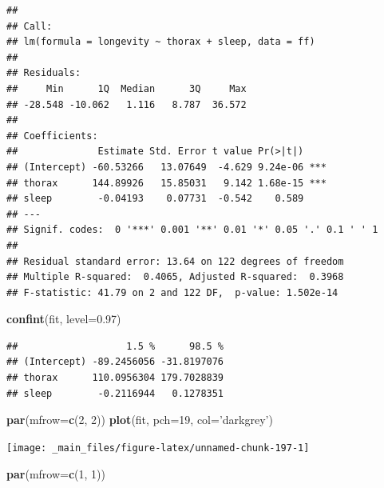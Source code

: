 \documentclass[]{book}
\newenvironment{Shaded}{\begin{snugshade}}{\end{snugshade}}
\newcommand{\KeywordTok}[1]{\textcolor[rgb]{0.13,0.29,0.53}{\textbf{#1}}}
\newcommand{\DataTypeTok}[1]{\textcolor[rgb]{0.13,0.29,0.53}{#1}}
\newcommand{\DecValTok}[1]{\textcolor[rgb]{0.00,0.00,0.81}{#1}}
\newcommand{\FloatTok}[1]{\textcolor[rgb]{0.00,0.00,0.81}{#1}}
\newcommand{\StringTok}[1]{\textcolor[rgb]{0.31,0.60,0.02}{#1}}
\newcommand{\NormalTok}[1]{#1}
\theoremstyle{definition}
\theoremstyle{definition}
\theoremstyle{definition}
\theoremstyle{remark}
\begin{document}
\begin{verbatim}
## 
## Call:
## lm(formula = longevity ~ thorax + sleep, data = ff)
## 
## Residuals:
##     Min      1Q  Median      3Q     Max 
## -28.548 -10.062   1.116   8.787  36.572 
## 
## Coefficients:
##              Estimate Std. Error t value Pr(>|t|)    
## (Intercept) -60.53266   13.07649  -4.629 9.24e-06 ***
## thorax      144.89926   15.85031   9.142 1.68e-15 ***
## sleep        -0.04193    0.07731  -0.542    0.589    
## ---
## Signif. codes:  0 '***' 0.001 '**' 0.01 '*' 0.05 '.' 0.1 ' ' 1
## 
## Residual standard error: 13.64 on 122 degrees of freedom
## Multiple R-squared:  0.4065, Adjusted R-squared:  0.3968 
## F-statistic: 41.79 on 2 and 122 DF,  p-value: 1.502e-14
\end{verbatim}

\begin{Shaded}
\begin{Highlighting}[]
\KeywordTok{confint}\NormalTok{(fit, }\DataTypeTok{level=}\FloatTok{0.97}\NormalTok{)}
\end{Highlighting}
\end{Shaded}

\begin{verbatim}
##                   1.5 %      98.5 %
## (Intercept) -89.2456056 -31.8197076
## thorax      110.0956304 179.7028839
## sleep        -0.2116944   0.1278351
\end{verbatim}

\begin{Shaded}
\begin{Highlighting}[]
\KeywordTok{par}\NormalTok{(}\DataTypeTok{mfrow=}\KeywordTok{c}\NormalTok{(}\DecValTok{2}\NormalTok{, }\DecValTok{2}\NormalTok{))}
\KeywordTok{plot}\NormalTok{(fit, }\DataTypeTok{pch=}\DecValTok{19}\NormalTok{, }\DataTypeTok{col=}\StringTok{'darkgrey'}\NormalTok{)}
\end{Highlighting}
\end{Shaded}

\begin{center}\texttt{[image: \_main\_files/figure-latex/unnamed-chunk-197-1]} \end{center}

\begin{Shaded}
\begin{Highlighting}[]
\KeywordTok{par}\NormalTok{(}\DataTypeTok{mfrow=}\KeywordTok{c}\NormalTok{(}\DecValTok{1}\NormalTok{, }\DecValTok{1}\NormalTok{))}
\end{Highlighting}
\end{Shaded}
\end{document}
